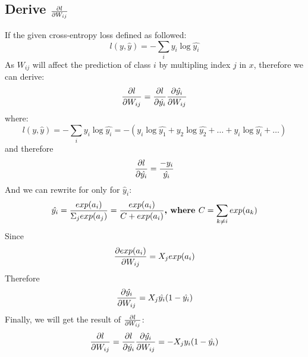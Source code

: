 \documentclass{article}
\begin{document}
\subsection{Derive ${\partial l\over \partial W_{ij}}$}
If the given cross-entropy loss defined as followed:
\begin{equation}
l(y, \hat{y}) = -\sum_i y_i\log\hat{y_i}
\end{equation}
As $W_{ij}$ will affect the prediction of class $i$ by multipling index $j$ in $x$, therefore we can derive:
\begin{equation}
{\partial l\over \partial W_{ij}} = {\partial l \over \partial \hat{y_i}} {\partial \hat{y_i} \over \partial W_{ij}}
\end{equation}
where:
\begin{equation}
l(y, \hat{y}) = -\sum_i y_i\log\hat{y_i} = -(y_i\log\hat{y_1} + y_2\log\hat{y_2} + \dots + y_i\log\hat{y_i} + \dots)
\end{equation}
and therefore
\begin{equation}
{\partial l \over \partial \hat{y_i}} = {-y_i\over \hat{y_i}}
\end{equation}
And we can rewrite for only for $\hat y_i$:
\begin{equation}
\hat{y_i} = {exp(a_i) \over \Sigma_j exp(a_j)} = {exp(a_i) \over C + exp(a_i)} \textbf{,  where $C = \sum_{k\neq i} exp(a_k)$}
\end{equation}
Since
\begin{equation}
{\partial exp(a_i) \over \partial W_{ij}} = X_jexp(a_i)
\end{equation}
Therefore
\begin{equation}
{\partial \hat{y_i} \over \partial W_{ij}} = X_j\hat{y_i}(1-\hat{y_i})
\end{equation}
Finally, we will get the result of ${\partial l\over \partial W_{ij}}$:
\begin{equation}
{\partial l\over \partial W_{ij}} = {\partial l \over \partial \hat{y_i}} {\partial \hat{y_i} \over \partial W_{ij}} = -X_jy_i(1- \hat{y_i})
\end{equation}
\end{document}

